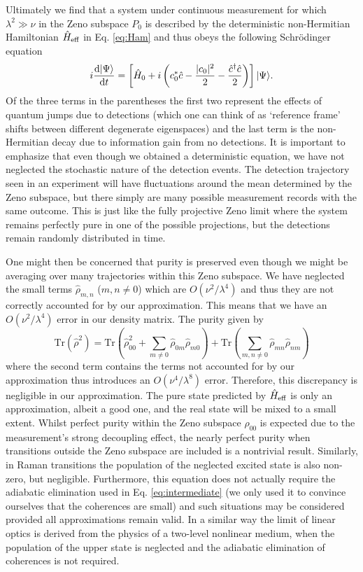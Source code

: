 Ultimately we find that a system under continuous measurement for
which $\lambda^2 \gg \nu$ in the Zeno subspace $P_0$ is described by
the deterministic non-Hermitian Hamiltonian $\hat{H}_\mathrm{eff}$ in
Eq. \eqref{eq:Ham} and thus obeys the following Schr\"{o}dinger
equation
\begin{equation}
 i \frac{\mathrm{d} | \Psi \rangle}{\mathrm{d}t} = \left[\hat{H}_0 + i \left(
      c_0^*\hat{c} - \frac{|c_0|^2}{2} - \frac{\hat{c}^\dagger\hat{c}}{2} \right) \right] |
  \Psi \rangle.
\end{equation}
Of the three terms in the parentheses the first two represent the
effects of quantum jumps due to detections (which one can think of as
`reference frame' shifts between different degenerate eigenspaces) and
the last term is the non-Hermitian decay due to information gain from
no detections. It is important to emphasize that even though we
obtained a deterministic equation, we have not neglected the
stochastic nature of the detection events. The detection trajectory
seen in an experiment will have fluctuations around the mean
determined by the Zeno subspace, but there simply are many possible
measurement records with the same outcome. This is just like the fully
projective Zeno limit where the system remains perfectly pure in one
of the possible projections, but the detections remain randomly
distributed in time.

One might then be concerned that purity is preserved even though we
might be averaging over many trajectories within this Zeno
subspace. We have neglected the small terms $\hat{\rho}_{m,n}$
($m,n \ne 0$) which are $O(\nu^2/\lambda^4)$ and thus they are not
correctly accounted for by our approximation. This means that we have
an $O(\nu^2/\lambda^4)$ error in our density matrix. The purity
given by
\begin{equation}
  \mathrm{Tr}(\hat{\rho}^2) = \mathrm{Tr}(\hat{\rho}^2_{00} + \sum_{m \ne
    0} \hat{\rho}_{0m}\hat{\rho}_{m0}) + \mathrm{Tr}(\sum_{m,n\ne0}
  \hat{\rho}_{mn} \hat{\rho}_{nm})
\end{equation}
where the second term contains the terms not accounted for by our
approximation thus introduces an $O(\nu^4/\lambda^8)$
error. Therefore, this discrepancy is negligible in our
approximation. The pure state predicted by $\hat{H}_\mathrm{eff}$ is only
an approximation, albeit a good one, and the real state will be mixed
to a small extent. Whilst perfect purity within the Zeno subspace
$\hat{\rho}_{00}$ is expected due to the measurement's strong
decoupling effect, the nearly perfect purity when transitions outside
the Zeno subspace are included is a nontrivial result. Similarly, in
Raman transitions the population of the neglected excited state is
also non-zero, but negligible. Furthermore, this equation does not
actually require the adiabatic elimination used in
Eq. \eqref{eq:intermediate} (we only used it to convince ourselves
that the coherences are small) and such situations may be considered
provided all approximations remain valid. In a similar way the limit
of linear optics is derived from the physics of a two-level nonlinear
medium, when the population of the upper state is neglected and the
adiabatic elimination of coherences is not required.

